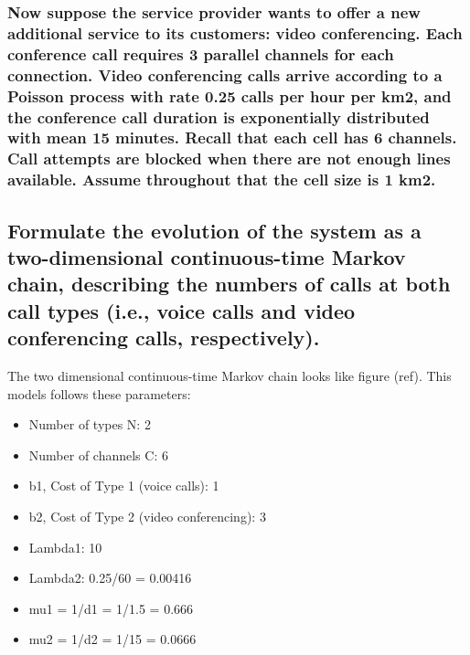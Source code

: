 \documentclass[11pt]{article}
\providecommand{\tightlist}{%
      \setlength{\itemsep}{0pt}\setlength{\parskip}{0pt}}
\begin{document}
    \subsubsection{Now suppose the service provider wants to offer a new
additional service to its customers: video conferencing. Each conference
call requires 3 parallel channels for each connection. Video
conferencing calls arrive according to a Poisson process with rate 0.25
calls per hour per km2, and the conference call duration is
exponentially distributed with mean 15 minutes. Recall that each cell
has 6 channels. Call attempts are blocked when there are not enough
lines available. Assume throughout that the cell size is 1
km2.}\label{now-suppose-the-service-provider-wants-to-offer-a-new-additional-service-to-its-customers-video-conferencing.-each-conference-call-requires-3-parallel-channels-for-each-connection.-video-conferencing-calls-arrive-according-to-a-poisson-process-with-rate-0.25-calls-per-hour-per-km2-and-the-conference-call-duration-is-exponentially-distributed-with-mean-15-minutes.-recall-that-each-cell-has-6-channels.-call-attempts-are-blocked-when-there-are-not-enough-lines-available.-assume-throughout-that-the-cell-size-is-1-km2.}

    \subsection{Formulate the evolution of the system as a two-dimensional
continuous-time Markov chain, describing the numbers of calls at both
call types (i.e., voice calls and video conferencing calls,
respectively).}\label{formulate-the-evolution-of-the-system-as-a-two-dimensional-continuous-time-markov-chain-describing-the-numbers-of-calls-at-both-call-types-i.e.-voice-calls-and-video-conferencing-calls-respectively.}

    The two dimensional continuous-time Markov chain looks like figure
(ref). This models follows these parameters:

\begin{itemize}
\tightlist
\item
  Number of types N: 2
\item
  Number of channels C: 6
\item
  b1, Cost of Type 1 (voice calls): 1
\item
  b2, Cost of Type 2 (video conferencing): 3
\item
  Lambda1: 10
\item
  Lambda2: 0.25/60 = 0.00416
\item
  mu1 = 1/d1 = 1/1.5 = 0.666
\item
  mu2 = 1/d2 = 1/15 = 0.0666
\end{itemize}
\end{document}
